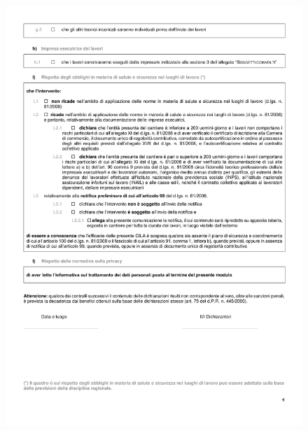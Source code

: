 \documentclass{elegantbook}
\begin{document}
		\begin{figure}[H]
			\centering
			\includegraphics[scale=0.8]{../Img/Documents/CILAS/CILAS-4.png}
		\end{figure}
	\newpage
\end{document}
